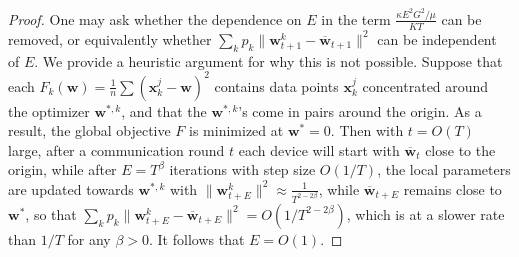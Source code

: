 \begin{proof}
\begin{comment}
	\begin{align*}
	(1-\mu\alpha_{t-1})\alpha_{t-1}^{2}+(1-\mu\alpha_{t})(1-\mu\alpha_{t-1})b\alpha_{t-1} & \leq(1-\mu\alpha_{t})\alpha_{t-1}^{2}+(1-\mu\alpha_{t})(1-\mu\alpha_{t-1})b\alpha_{t-1}\\
	& \le(1-\mu\alpha_{t})\alpha_{t-1}(\alpha_{t-1}+(1-\mu\alpha_{t-1})b)\\
	& \leq(1-\mu\alpha_{t})b\alpha_{t}
	\end{align*}
	so that 
	\begin{align*}
	(1-\mu\alpha_{t})\beta\alpha_{t}+\alpha_{t}^{2} & \leq b\alpha_{t+1}\\
	\end{align*}
	\begin{align*}
	(1-\mu\alpha_{t-1})\alpha_{t-1}^{2}+(1-\mu\alpha_{t})(1-\mu\alpha_{t-1})b\alpha_{t-1} & \leq\alpha_{t}^{2}+(1-\mu\alpha_{t-1})\alpha_{t-1}(\alpha_{t-1}+b(1-\mu\alpha_{t}))\le\\
	(\alpha_{t-1}+b(1-\mu\alpha_{t}))\alpha_{t}\leq
	\end{align*}
	\end{proof}
	\end{comment}
	
	One may ask whether the dependence on $E$ in the term $\frac{\kappa E^{2}G^{2}/\mu}{KT}$
	can be removed, or equivalently whether $\sum_{k}p_{k}\|\mathbf{w}_{t+1}^{k}-\overline{\mathbf{w}}_{t+1}\|^{2}$
	can be independent of $E$. We provide a heuristic argument for why
	this is not possible. Suppose that each $F_{k}(\mathbf{w})=\frac{1}{n}\sum(\mathbf{x}_{k}^{j}-\mathbf{w})^{2}$
	contains data points $\mathbf{x}_{k}^{j}$ concentrated around the
	optimizer $\mathbf{w}^{\ast,k}$, and that the $\mathbf{w}{}^{\ast,k}$'s
	come in pairs around the origin. As a result, the global objective
	$F$ is minimized at $\mathbf{w}^{\ast}=0$. Then with $t=O(T)$ large,
	after a communication round $t$ each device will start with $\overline{\mathbf{w}}_{t}$
	close to the origin, while after $E=T^{\beta}$ iterations with step
	size $O(1/T)$, the local parameters are updated towards $\mathbf{w}^{\ast,k}$
	with $\|\mathbf{w}_{t+E}^{k}\|^{2}\approx\frac{1}{T^{2-2\beta}}$,
	while $\overline{\mathbf{w}}_{t+E}$ remains close to $\mathbf{w}^{\ast}$,
	so that $\sum_{k}p_{k}\|\mathbf{w}_{t+E}^{k}-\overline{\mathbf{w}}_{t+E}\|^{2}=O(1/T^{2-2\beta})$,
	which is at a slower rate than $1/T$ for any $\beta>0$. It follows
	that $E=O(1)$. 
\end{proof}